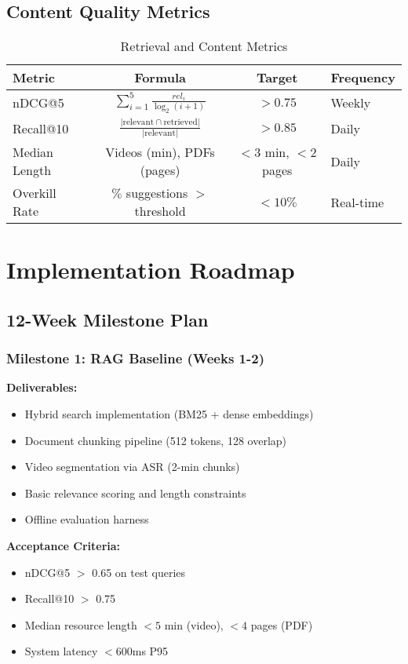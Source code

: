 \documentclass[11pt,a4paper]{report}
\begin{document}
\section{Content Quality Metrics}

\begin{table}[H]
\centering
\caption{Retrieval and Content Metrics}
\begin{tabular}{lccl}
\toprule
\textbf{Metric} & \textbf{Formula} & \textbf{Target} & \textbf{Frequency} \\
\midrule
nDCG@5 & $\sum_{i=1}^{5} \frac{rel_i}{\log_2(i+1)}$ & $>0.75$ & Weekly \\
Recall@10 & $\frac{|\text{relevant} \cap \text{retrieved}|}{|\text{relevant}|}$ & $>0.85$ & Daily \\
Median Length & Videos (min), PDFs (pages) & $<3$ min, $<2$ pages & Daily \\
Overkill Rate & $\%$ suggestions $>$ threshold & $<10\%$ & Real-time \\
\bottomrule
\end{tabular}
\end{table}

\chapter{Implementation Roadmap}

\section{12-Week Milestone Plan}

\subsection{Milestone 1: RAG Baseline (Weeks 1-2)}

\textbf{Deliverables:}
\begin{itemize}
    \item Hybrid search implementation (BM25 + dense embeddings)
    \item Document chunking pipeline (512 tokens, 128 overlap)
    \item Video segmentation via ASR (2-min chunks)
    \item Basic relevance scoring and length constraints
    \item Offline evaluation harness
\end{itemize}

\textbf{Acceptance Criteria:}
\begin{itemize}
    \item nDCG@5 $>$ 0.65 on test queries
    \item Recall@10 $>$ 0.75
    \item Median resource length $<5$ min (video), $<4$ pages (PDF)
    \item System latency $<600$ms P95
\end{itemize}
\end{document}
